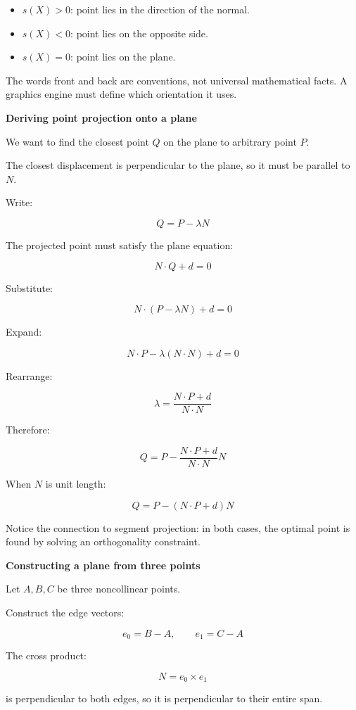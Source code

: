 \begin{itemize}
\tightlist
\item
  \(s(X)>0\): point lies in the direction of the normal.
\item
  \(s(X)<0\): point lies on the opposite side.
\item
  \(s(X)=0\): point lies on the plane.
\end{itemize}

The words front and back are conventions, not universal mathematical facts. A graphics engine must define which orientation it uses.

\textbf{Deriving point projection onto a plane}

We want to find the closest point \(Q\) on the plane to arbitrary point \(P\).

The closest displacement is perpendicular to the plane, so it must be parallel to \(N\).

Write:

\[
Q=P-\lambda N
\]

The projected point must satisfy the plane equation:

\[
N\cdot Q+d=0
\]

Substitute:

\[
N\cdot(P-\lambda N)+d=0
\]

Expand:

\[
N\cdot P-\lambda(N\cdot N)+d=0
\]

Rearrange:

\[
\lambda=\frac{N\cdot P+d}{N\cdot N}
\]

Therefore:

\[
\boxed{ Q=P-\frac{N\cdot P+d}{N\cdot N}N }
\]

When \(N\) is unit length:

\[
\boxed{Q=P-(N\cdot P+d)N}
\]

Notice the connection to segment projection: in both cases, the optimal point is found by solving an orthogonality constraint.

\textbf{Constructing a plane from three points}

Let \(A,B,C\) be three noncollinear points.

Construct the edge vectors:

\[
e_0=B-A,\qquad e_1=C-A
\]

The cross product:

\[
N=e_0\times e_1
\]

is perpendicular to both edges, so it is perpendicular to their entire span.

